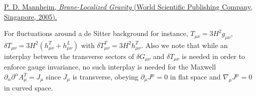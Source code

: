 \documentclass[aps,onecolumn,10pt]{revtex4}
\numberwithin{equation}{section}
\numberwithin{equation}{section}
\begin{document}
\begin{thebibliography}{99}
  \href{https://doi.org/10.1142/5975}{P. D. Mannheim, \textit{Brane-Localized Gravity} (World Scientific Publishing Company, Singapore, 2005).}

 For fluctuations around a de Sitter background for instance, $T_{\mu\nu}=3H^2g_{\mu\nu}$, $\delta T_{\mu\nu}=3H^2(h^T_{\mu\nu}+h^L_{\mu\nu})$ with $\delta T^T_{\mu\nu}=3H^2h^T_{\mu\nu}$. Also we note that while an interplay between the transverse sectors of $\delta G_{\mu\nu}$ and $\delta T_{\mu\nu}$ is needed in order to enforce gauge invariance, no such interplay is needed for the Maxwell $\partial_{\alpha}\partial^{\alpha} A_{\mu}^T=J_{\mu}$ since $J_{\mu}$ is transverse, obeying $\partial_{\mu}J^{\mu}=0$ in flat space and $\nabla_{\mu}J^{\mu}=0$ in curved space.











\end{thebibliography} 
\end{document}
